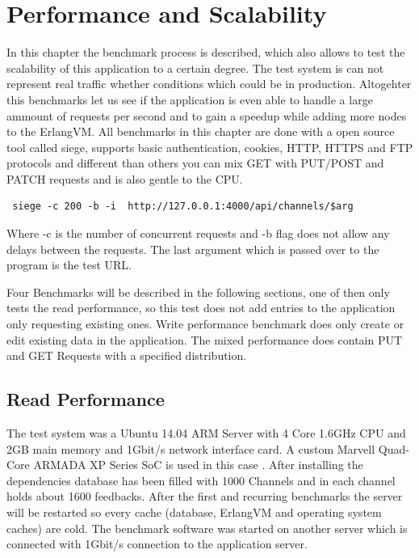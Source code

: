 \chapter{Performance and Scalability} \label{Performance and Scalability}
\label{perf_scale}
In this chapter the benchmark process is described, which also allows to test the scalability of this application to a certain degree. The test system is can not represent real traffic whether conditions which could be in production. Altogehter this benchmarks let us see if the application is even able to handle a large ammount of requests per second and to gain a speedup while adding more nodes to the ErlangVM.
All benchmarks in this chapter are done with a open source tool called siege, supports basic authentication, cookies, HTTP, HTTPS and FTP protocols and different than others you can mix GET with PUT/POST and PATCH requests and is also gentle to the CPU.
\begin{verbatim} siege -c 200 -b -i  http://127.0.0.1:4000/api/channels/$arg
\end{verbatim} Where -c is the number of concurrent requests and -b flag does not allow any delays between the requests. The last argument which is passed over to the program is the test URL.

Four Benchmarks will be described in the following sections, one of then only tests the read performance, so this test does not add entries to the application only requesting existing ones. Write performance benchmark does only create or edit existing data in the application.
The mixed performance does contain PUT and GET Requests with a specified distribution.

\section{Read Performance}
The test system was a Ubuntu 14.04 ARM Server with 4 Core 1.6GHz CPU and 2GB main memory and 1Gbit/s network interface card.  A custom Marvell Quad-Core ARMADA XP Series SoC is used in this case \cite{MarArm}.  After installing the dependencies database has been filled with 1000 Channels and in each channel holds about 1600 feedbacks. After the first and recurring benchmarks the server will be restarted so every cache (database, ErlangVM and operating system caches) are cold. The benchmark software was started on another server which is connected with 1Gbit/s connection to the application server.

\lstset{
    frame=single,
    breaklines=true,
}

